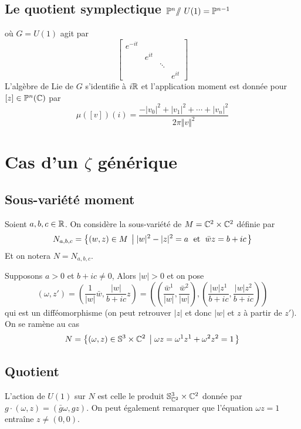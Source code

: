 \documentclass[a4paper,10pt]{article}
\begin{document}
\subsection{Le quotient symplectique $\mathbb{P}^n /\!\!/\ U(1) = \mathbb{P}^{n-1}$}
où $G = U(1)$ agit par
\[
\begin{bmatrix}
e^{-it} & & &\\
        & e^{it} & &\\
        & & \ddots &\\
        & & & e^{it}
\end{bmatrix}
\]
L'algèbre de Lie de $G$ s'identifie à $i\mathbb{R}$ et l'application moment est donnée pour $[z] \in \mathbb{P}^n(\mathbb{C})$ par
\[
\mu([v])(i) = \dfrac{-|v_0|^2 + |v_1|^2 + \cdots + |v_n|^2}{2\pi \Vert v \Vert^2}
\]



















\appendix
\section{Cas d'un $\zeta$ générique}
\subsection{Sous-variété moment}
Soient $a,b,c \in \mathbb{R}$. On considère la sous-variété de $M = \mathbb{C}^2 \times \mathbb{C}^2$ définie par
\[
N_{a,b,c} = \left\lbrace {(w,z) \in M} \; \left| \; {|w|^2-|z|^2 = a \;\text{ et }\; \bar{w}z = b+ic} \right. \right\rbrace
\]
Et on notera $N = N_{a,b,c}$.


Supposons $a>0$ et $b+ic \neq 0$, Alors $|w| > 0$ et on pose
\[
(\omega,z') = \left(
\dfrac{1}{|w|}\bar{w} , \dfrac{|w|}{b+ic}z
\right)
= \left(
\left(\dfrac{\bar{w}^1}{|w|} ,\dfrac{\bar{w}^2}{|w|}\right), \left(\dfrac{|w|z^1}{b+ic}, \dfrac{|w|z^2}{b+ic}\right)
\right)
\]
qui est un difféomorphisme (on peut retrouver $|z|$ et donc $|w|$ et $z$ à partir de $z'$).
On se ramène au cas
\[
N = \left\lbrace {(\omega,z) \in \mathbb{S}^3 \times \mathbb{C}^2} \; \left| \; {\omega z = \omega^1z^1 + \omega^2z^2 = 1} \right. \right\rbrace
\]

\subsection{Quotient}
L'action de $U(1)$ sur $N$ est celle le produit $\mathbb{S}^3_{\mathbb{C}^2} \times \mathbb{C}^2$ donnée par $g\cdot (\omega,z) = (\bar{g}\omega,gz)$. On peut également remarquer que l'équation $\omega z = 1$ entraîne $z \neq (0,0)$.
\end{document}
